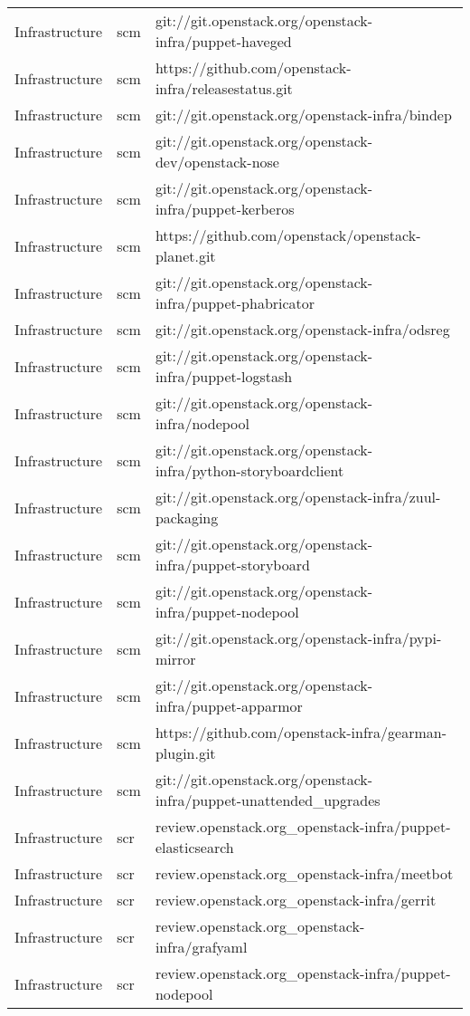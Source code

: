\begin{center}
\begin{longtable}{|p{4cm}|p{1cm}|p{10cm}|}
Infrastructure&scm&git://git.openstack.org/openstack-infra/puppet-haveged\\ 
Infrastructure&scm&https://github.com/openstack-infra/releasestatus.git\\ 
Infrastructure&scm&git://git.openstack.org/openstack-infra/bindep\\ 
Infrastructure&scm&git://git.openstack.org/openstack-dev/openstack-nose\\ 
Infrastructure&scm&git://git.openstack.org/openstack-infra/puppet-kerberos\\ 
Infrastructure&scm&https://github.com/openstack/openstack-planet.git\\ 
Infrastructure&scm&git://git.openstack.org/openstack-infra/puppet-phabricator\\ 
Infrastructure&scm&git://git.openstack.org/openstack-infra/odsreg\\ 
Infrastructure&scm&git://git.openstack.org/openstack-infra/puppet-logstash\\ 
Infrastructure&scm&git://git.openstack.org/openstack-infra/nodepool\\ 
Infrastructure&scm&git://git.openstack.org/openstack-infra/python-storyboardclient\\ 
Infrastructure&scm&git://git.openstack.org/openstack-infra/zuul-packaging\\ 
Infrastructure&scm&git://git.openstack.org/openstack-infra/puppet-storyboard\\ 
Infrastructure&scm&git://git.openstack.org/openstack-infra/puppet-nodepool\\ 
Infrastructure&scm&git://git.openstack.org/openstack-infra/pypi-mirror\\ 
Infrastructure&scm&git://git.openstack.org/openstack-infra/puppet-apparmor\\ 
Infrastructure&scm&https://github.com/openstack-infra/gearman-plugin.git\\ 
Infrastructure&scm&git://git.openstack.org/openstack-infra/puppet-unattended\_upgrades\\ 
Infrastructure&scr&review.openstack.org\_openstack-infra/puppet-elasticsearch\\ 
Infrastructure&scr&review.openstack.org\_openstack-infra/meetbot\\ 
Infrastructure&scr&review.openstack.org\_openstack-infra/gerrit\\ 
Infrastructure&scr&review.openstack.org\_openstack-infra/grafyaml\\ 
Infrastructure&scr&review.openstack.org\_openstack-infra/puppet-nodepool\\ 

\end{longtable}
\end{center}
